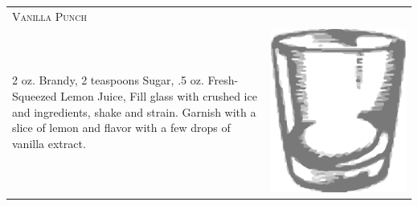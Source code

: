 \documentclass{article}
\begin{document}
\begin{tabular}{p{2in} p{0.5in}}
\multicolumn{2}{p{3in}}{\centering\Huge\textsc{Vanilla Punch}} \\ 
  \vspace{-0.1in}2 oz. Brandy, 2 teaspoons Sugar, .5 oz. Fresh-Squeezed Lemon Juice, Fill glass with crushed ice and ingredients, shake and strain. Garnish with a slice of lemon and flavor with a few drops of vanilla extract. &  
  \vspace{-0.1in} \includegraphics{rocks_glass.png}
\end{tabular}
\end{document}
